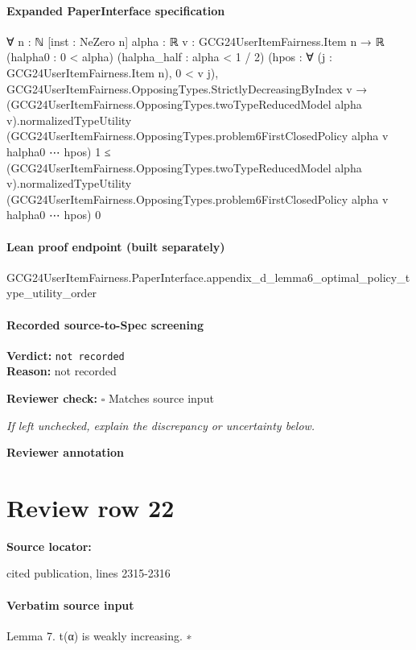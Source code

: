 \documentclass[10pt]{article}
\newcommand{\reviewerbox}{%
  \par\noindent\fbox{\parbox{0.96\linewidth}{\rule{0pt}{0.38in}}}\par
}
\newcommand{\reviewmatch}[1]{%
  \par\noindent\textbf{Reviewer check:} $\square$\; #1\par
  \noindent\emph{If left unchecked, explain the discrepancy or uncertainty below.}\par
}
\begin{document}
\paragraph{Expanded PaperInterface specification}
\begin{ReviewVerbatim}
∀ {n : ℕ} [inst : NeZero n] {alpha : ℝ} {v : GCG24UserItemFairness.Item n → ℝ} (halpha0 : 0 < alpha)
  (halpha_half : alpha < 1 / 2) (hpos : ∀ (j : GCG24UserItemFairness.Item n), 0 < v j),
  GCG24UserItemFairness.OpposingTypes.StrictlyDecreasingByIndex v →
    (GCG24UserItemFairness.OpposingTypes.twoTypeReducedModel alpha v).normalizedTypeUtility
        (GCG24UserItemFairness.OpposingTypes.problem6FirstClosedPolicy alpha v halpha0 ⋯ hpos) 1 ≤
      (GCG24UserItemFairness.OpposingTypes.twoTypeReducedModel alpha v).normalizedTypeUtility
        (GCG24UserItemFairness.OpposingTypes.problem6FirstClosedPolicy alpha v halpha0 ⋯ hpos) 0
\end{ReviewVerbatim}

\paragraph{Lean proof endpoint (built separately)}\begin{ReviewVerbatim}
GCG24UserItemFairness.PaperInterface.appendix_d_lemma6_optimal_policy_type_utility_order
\end{ReviewVerbatim}

\paragraph{Recorded source-to-Spec screening}
\textbf{Verdict:} \texttt{not recorded}
\\
\textbf{Reason:} not recorded
\reviewmatch{Matches source input}
\noindent\textbf{Reviewer annotation}\par
\reviewerbox
\clearpage
\hypertarget{source-claim-9c661bd3034e665b}{}
\section*{Review row 22}
\textbf{Source locator:} {\footnotesize\raggedright cited publication, lines 2315-\allowbreak{}2316\par}
\paragraph{Verbatim source input}
\begin{ReviewVerbatim}
Lemma 7. t(α) is weakly increasing.
∗
\end{ReviewVerbatim}
\end{document}
